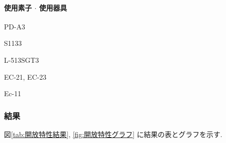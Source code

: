 \documentclass[titlepage]{jsarticle}
\begin{document}
            \paragraph{使用素子 $\cdot$ 使用器具}
                \begin{description}
                    \setlength{\leftskip}{1.5em}
                    \item[組立済回路] PD-A3
                    \item[PD] S1133
                    \item[LED] L-513SGT3
                    \item[デジタルマルチメータ] EC-21, EC-23
                    \item[直流電源] Ec-11
                \end{description}

        \subsubsection{結果}
            図\ref{tab:開放特性結果}, \ref{fig:開放特性グラフ}
            に結果の表とグラフを示す.
\end{document}
